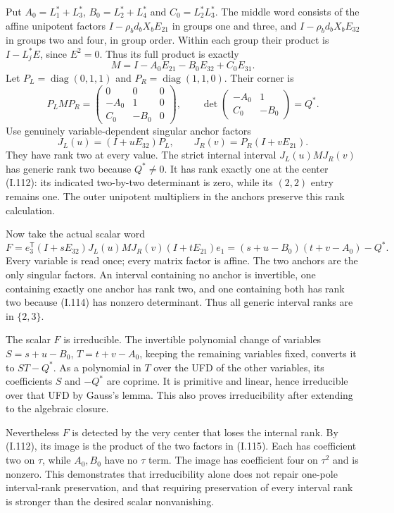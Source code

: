 Put $A_0=L_1^*+L_3^*$, $B_0=L_2^*+L_4^*$ and $C_0=L_2^*L_3^*$.
The middle word consists of the affine unipotent factors
$I-\rho_bd_bX_bE_{21}$ in groups one and three, and
$I-\rho_bd_bX_bE_{32}$ in groups two and four, in group order.
Within each group their product is $I-L_j^*E$, since $E^2=0$.
Thus its full product is exactly
\[
 M=I-A_0E_{21}-B_0E_{32}+C_0E_{31}.
 \tag{I.113}
\]
Let $P_L=\operatorname{diag}(0,1,1)$ and
$P_R=\operatorname{diag}(1,1,0)$. Their corner is
\[
 P_LMP_R=
 \begin{pmatrix}0&0&0\\-A_0&1&0\\C_0&-B_0&0\end{pmatrix},
 \qquad
 \det\begin{pmatrix}-A_0&1\\C_0&-B_0\end{pmatrix}=Q^*.
 \tag{I.114}
\]
Use genuinely variable-dependent singular anchor factors
\[
 J_L(u)=(I+uE_{32})P_L,\qquad
 J_R(v)=P_R(I+vE_{21}).
\]
They have rank two at every value. The strict internal interval
$J_L(u)M J_R(v)$ has generic rank two because $Q^*\ne0$.
It has rank exactly one at the center (I.112): its indicated
two-by-two determinant is zero, while its $(2,2)$ entry remains
one. The outer unipotent multipliers in the anchors preserve
this rank calculation.

Now take the actual scalar word
\[
 F=e_3^{\mathsf T}(I+sE_{32})J_L(u)M J_R(v)
                      (I+tE_{21})e_1
   =(s+u-B_0)(t+v-A_0)-Q^*.
 \tag{I.115}
\]
Every variable is read once; every matrix factor is affine.
The two anchors are the only singular factors. An interval
containing no anchor is invertible, one containing exactly one
anchor has rank two, and one containing both has rank two
because (I.114) has nonzero determinant. Thus all generic
interval ranks are in $\{2,3\}$.

The scalar $F$ is irreducible. The invertible polynomial change
of variables $S=s+u-B_0$, $T=t+v-A_0$, keeping the remaining
variables fixed, converts it to $ST-Q^*$. As a polynomial in
$T$ over the UFD of the other variables, its coefficients $S$
and $-Q^*$ are coprime. It is primitive and linear, hence
irreducible over that UFD by Gauss's lemma. This also proves
irreducibility after extending to the algebraic closure.

Nevertheless $F$ is detected by the very center that loses
the internal rank. By (I.112), its image is the product of
the two factors in (I.115). Each has coefficient two on
$\tau$, while $A_0,B_0$ have no $\tau$ term. The image has
coefficient four on $\tau^2$ and is nonzero. This demonstrates
that irreducibility alone does not repair one-pole interval-rank
preservation, and that requiring preservation of every interval
rank is stronger than the desired scalar nonvanishing.

